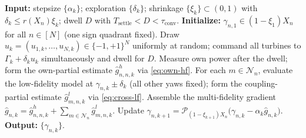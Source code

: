 \begin{algorithm}
\caption{Cooperative Distributed Online Feedback Optimization Based on Multi-Fidelity Gradient Estimator.}
\label{alg:doo-mf}
\begin{algorithmic}
    \STATE \textbf{Input:} stepsize $\{\alpha_k\}$; exploration $\{\delta_k\}$; shrinkage $\{\xi_k\} \subset (0,1)$ with $\delta_k \le r(X_n)\xi_k$; dwell $D$ with $T_{\text{settle}} < D < \tau_{\text{conv}}$.
    \STATE \textbf{Initialize:} $\gamma_{n,1} \in (1-\xi_1)X_n$ for all $n \in [N]$ (one sign quadrant fixed).
        \STATE Draw $u_k=(u_{1,k},\dots,u_{N,k}) \in \{-1,+1\}^N$ uniformly at random; command all turbines to $\Gamma_k+\delta_k u_k$ simultaneously and dwell for $D$.
            \STATE Measure own power after the dwell; form the own-partial estimate $\hat{g}^{h}_{n,n,k}$ via \eqref{eq:own-hf}.
            \STATE For each $m \in \mathcal{N}_n$, evaluate the low-fidelity model at $\gamma_{n,k} \pm \delta_k$ (all other yaws fixed); form the coupling-partial estimate $\hat{g}^{l}_{m,n,k}$ via \eqref{eq:cross-lf}.
            \STATE Assemble the multi-fidelity gradient $\hat{g}_{n,k} = \hat{g}^{h}_{n,n,k} + \sum_{m \in \mathcal{N}_n}\hat{g}^{l}_{m,n,k}$.
            \STATE Update $\gamma_{n,k+1} = \mathcal{P}_{(1-\xi_{k+1})X_n}\big(\gamma_{n,k} - \alpha_{k}\hat{g}_{n,k}\big)$.
        \ENDFOR
    \ENDFOR
    \STATE \textbf{Output:} $\{\gamma_{n,k}\}$.
\end{algorithmic}
\end{algorithm}
